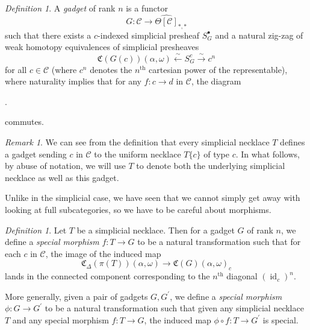 \documentclass{amsart}
\numberwithin{equation}{section}
\theoremstyle{plain}   %
\theoremstyle{remark}
\newtheorem{rem}[subsection]{Remark}
\newtheorem{defn}[subsection]{Definition}
\theoremstyle{plain}
\DeclareMathOperator{\id}{id}
\newcommand{\C}{\ensuremath{\mathcal{C}}}
\newcommand{\cellset}{\ensuremath{\widehat{\Theta[\mathcal{C}]}}}
\begin{document}
\begin{defn}
	A \emph{gadget} of rank \(n\) is a functor \[G: \C \to \cellset_{\ast,\ast}\] such that there exists a \(c\)-indexed simplicial presheaf \(S_G^\bullet\) and a natural zig-zag of weak homotopy equivalences of simplicial presheaves \[\mathfrak{C}(G(c))(\alpha,\omega) \xleftarrow{\sim} S_G^c \xrightarrow{\sim} c^n\] for all \(c\in \C\) (where \(c^n\) denotes the \(n^\mathrm{th}\) cartesian power of the representable), where naturality implies that for any \(f:c\to d\) in \(\C\), the diagram
	\begin{center}
		.
	\end{center}
	commutes.
\end{defn}

\begin{rem}
	We can see from the definition that every simplicial necklace \(T\) defines a gadget sending \(c\) in \(\C\) to the uniform necklace \(T\{c\}\) of type \(c\).  In what follows, by abuse of notation, we will use \(T\) to denote both the underlying simplicial necklace as well as this gadget.
\end{rem}

Unlike in the simplicial case, we have seen that we cannot simply get away with looking at full subcategories, so we have to be careful about morphisms.

\begin{defn}
	Let \(T\) be a simplicial necklace.  Then for a gadget \(G\) of rank \(n\), we define a \emph{special morphism} \(f:T\to G\) to be a natural transformation such that for each \(c\) in \(\C\), the image of the induced map \[\mathfrak{C}_\Delta(\pi(T))(\alpha,\omega) \to \mathfrak{C}(G)(\alpha,\omega)_c\] lands in the connected component corresponding to the \(n^\mathrm{th}\) diagonal \((\id_c)^n\).

	More generally, given a pair of gadgets \(G,G^\prime\), we define a \emph{special morphism} \(\phi:G\to G^\prime\) to be a natural transformation such that given any simplicial necklace \(T\) and any special morphism \(f:T\to G\), the induced map \(\phi\circ f:T\to G^\prime\) is special.
\end{defn}
\end{document}
